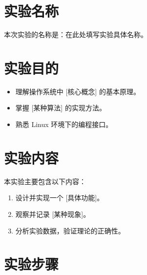 \documentclass[a4paper,12pt]{ctexart}
\begin{document}
\newpage
\restoregeometry

\tableofcontents
\newpage


\pagestyle{fancy}
\fancyhf{} %
\renewcommand{\headrulewidth}{0pt} %
\cfoot{\thepage} %

\section{实验名称}

本次实验的名称是：在此处填写实验具体名称。

\section{实验目的}
\begin{itemize}
    \item 理解操作系统中 [核心概念] 的基本原理。
    \item 掌握 [某种算法] 的实现方法。
    \item 熟悉 Linux 环境下的编程接口。
\end{itemize}

\section{实验内容}
本实验主要包含以下内容：
\begin{enumerate}
    \item 设计并实现一个 [具体功能]。
    \item 观察并记录 [某种现象]。
    \item 分析实验数据，验证理论的正确性。
\end{enumerate}

\section{实验步骤}
\end{document}
